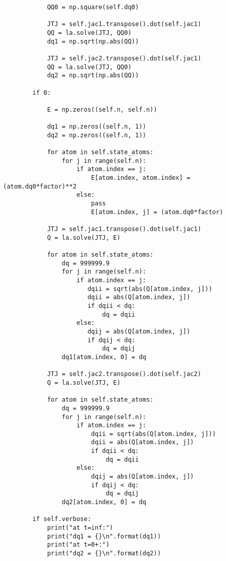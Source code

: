 \begin{lstlisting}
            QQ0 = np.square(self.dq0)

            JTJ = self.jac1.transpose().dot(self.jac1)
            QQ = la.solve(JTJ, QQ0)
            dq1 = np.sqrt(np.abs(QQ))

            JTJ = self.jac2.transpose().dot(self.jac1)
            QQ = la.solve(JTJ, QQ0)
            dq2 = np.sqrt(np.abs(QQ))

        if 0:
        
            E = np.zeros((self.n, self.n))

            dq1 = np.zeros((self.n, 1))
            dq2 = np.zeros((self.n, 1))

            for atom in self.state_atoms:
                for j in range(self.n):
                    if atom.index == j:
                        E[atom.index, atom.index] = (atom.dq0*factor)**2
                    else:
                        pass
                        E[atom.index, j] = (atom.dq0*factor)

            JTJ = self.jac1.transpose().dot(self.jac1)
            Q = la.solve(JTJ, E)

            for atom in self.state_atoms:
                dq = 999999.9
                for j in range(self.n):
                    if atom.index == j:
                       dqii = sqrt(abs(Q[atom.index, j]))
                       dqii = abs(Q[atom.index, j])
                       if dqii < dq:
                           dq = dqii
                    else:
                       dqij = abs(Q[atom.index, j])
                       if dqij < dq:
                           dq = dqij
                dq1[atom.index, 0] = dq

            JTJ = self.jac2.transpose().dot(self.jac2)
            Q = la.solve(JTJ, E)

            for atom in self.state_atoms:
                dq = 999999.9
                for j in range(self.n):
                    if atom.index == j:
                        dqii = sqrt(abs(Q[atom.index, j]))
                        dqii = abs(Q[atom.index, j])
                        if dqii < dq:
                            dq = dqii
                    else:
                        dqij = abs(Q[atom.index, j])
                        if dqij < dq:
                            dq = dqij
                dq2[atom.index, 0] = dq

        if self.verbose:
            print("at t=inf:")
            print("dq1 = {}\n".format(dq1))
            print("at t=0+:")
            print("dq2 = {}\n".format(dq2))


\end{lstlisting}
